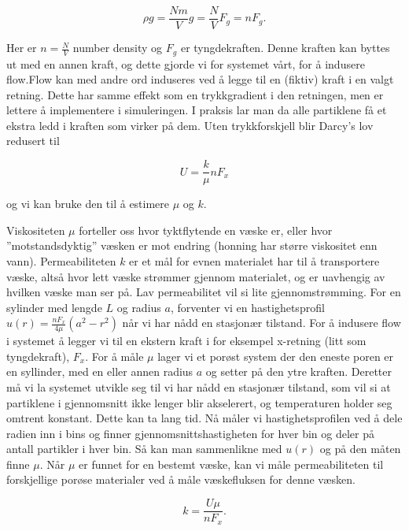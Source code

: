 \documentclass[a4paper,10pt]{article}
\begin{document}
\begin{equation}
 \rho g = \frac{Nm}{V}g = \frac{N}{V}F_g = nF_g.
\end{equation}

Her er $n=\frac{N}{V}$ number density og $F_g$ er tyngdekraften. Denne kraften kan byttes ut med en annen kraft, og dette gjorde vi for systemet vårt, for å indusere flow.Flow kan med andre ord induseres ved å legge til en (fiktiv) kraft i en valgt retning. Dette har samme effekt som en trykkgradient i den retningen, men er lettere å implementere i simuleringen. I praksis lar man da alle partiklene få et ekstra ledd i kraften som virker på dem. Uten trykkforskjell blir Darcy's lov redusert til

\begin{equation}
 U = \frac{k}{\mu}nF_x
\end{equation}

og vi kan bruke den til å estimere $\mu$ og $k$. 

Viskositeten $\mu$ forteller oss hvor tyktflytende en væske er, eller hvor ”motstandsdyktig” væsken er mot endring (honning har større viskositet enn vann). Permeabiliteten $k$ er et mål for evnen materialet har til å transportere væske, altså hvor lett væske strømmer gjennom materialet, og er uavhengig av hvilken væske man ser på. Lav permeabilitet vil si lite gjennomstrømming. For en sylinder med lengde $L$ og radius $a$, forventer vi en hastighetsprofil $u(r) = \frac{nF_x}{4\mu}(a^2 - r^2)$ når vi har nådd en stasjonær tilstand. 
For å indusere flow i systemet å legger vi til en ekstern kraft i for eksempel x-retning (litt som tyngdekraft), $F_x$. For å måle $\mu$ lager vi et porøst system der den eneste poren er en syllinder, med en eller annen radius $a$ og setter på den ytre kraften. Deretter må vi la systemet utvikle seg til vi har nådd en stasjonær tilstand, som vil si at partiklene i gjennomsnitt ikke lenger blir akselerert, og temperaturen holder seg omtrent konstant. Dette kan ta lang tid. Nå måler vi hastighetsprofilen ved å dele radien inn i bins og finner gjennomsnittshastigheten for hver bin og deler på antall partikler i hver bin. Så kan man sammenlikne med $u(r)$ og på den måten finne $\mu$. Når $\mu$ er funnet for en bestemt væske, kan vi måle permeabiliteten til forskjellige porøse materialer ved å måle væskefluksen for denne væsken.

\begin{equation}
 k = \frac{U\mu}{nF_x}.
\end{equation}
\end{document}
